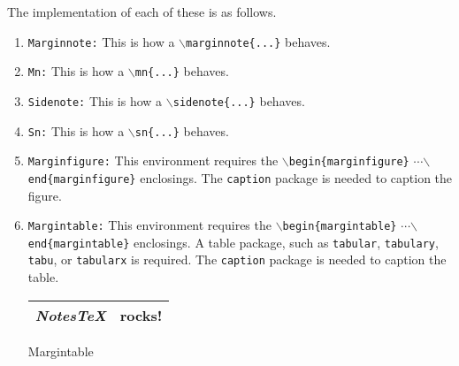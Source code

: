 The implementation of each of these is as follows.
\begin{enumerate}
    \item \texttt{Marginnote:} This is how a \texttt{$\backslash$marginnote\{...\}} behaves.
    \item \texttt{Mn:} This is how a \texttt{$\backslash$mn\{...\}} behaves.
    \item \texttt{Sidenote:} This is how a \texttt{$\backslash$sidenote\{...\}} behaves.
    \item \texttt{Sn:} This is how a \texttt{$\backslash$sn\{...\}} behaves.
    \item \texttt{Marginfigure:} This environment requires the \texttt{$\backslash$begin\{marginfigure\}} {$\cdots$}\newline\texttt{$\backslash$end\{marginfigure\}} enclosings. The \texttt{caption} package is needed to caption the figure.
    \begin{marginfigure}
    \begin{center}
    \end{center}
    \end{marginfigure}%
    \item \texttt{Margintable:} This environment requires the \texttt{$\backslash$begin\{margintable\}} {$\cdots$}\newline\texttt{$\backslash$end\{margintable\}} enclosings. A table package, such as \texttt{tabular}, \texttt{tabulary}, \texttt{tabu}, or \texttt{tabularx} is required. The \texttt{caption} package is needed to caption the table.
    \begin{margintable}
        \vspace{.1in}
        \begin{tabularx}{\marginparwidth}{|X|X|}
        \hline
        \textit{NotesTeX} & \textbf{rocks!}\\
        \hline
        \end{tabularx}
        \caption{Margintable}
    \end{margintable}
\end{enumerate}
